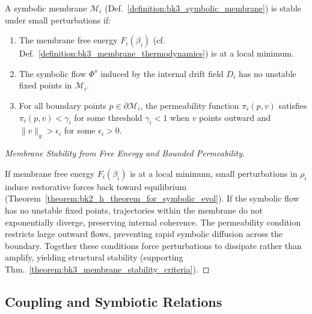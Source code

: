 \begin{theorem} \label{theorem:bk3_membrane_stability_criteria}
A symbolic membrane $\mathcal{M}_i$ (Def.~\ref{definition:bk3_symbolic_membrane}) is stable under small perturbations if:
\begin{enumerate}
    \item The membrane free energy $F_i(\beta_i)$ (cf. Def.~\ref{definition:bk3_membrane_thermodynamics}) is at a local minimum.
    \item The symbolic flow $\Phi^s$ induced by the internal drift field $D_i$ has no unstable fixed points in $\mathcal{M}_i$.
    \item For all boundary points $p \in \partial\mathcal{M}_i$, the permeability function $\pi_i(p,v)$ satisfies $\pi_i(p,v) < \gamma_i$ for some threshold $\gamma_i < 1$ when $v$ points outward and $\|v\|_g > \epsilon_i$ for some $\epsilon_i > 0$.
\end{enumerate}
\end{theorem}

\begin{proof}[Membrane Stability from Free Energy and Bounded Permeability]
\label{proof:bk3_membrane_stability_energy_permeability}
\leavevmode

If membrane free energy $F_i(\beta_i)$ is at a local minimum, small
perturbations in $\rho_i$ induce restorative forces back toward equilibrium
(Theorem~\ref{theorem:bk2_h_theorem_for_symbolic_evol}).
If the symbolic flow has no unstable fixed points, trajectories within the membrane do not exponentially diverge, preserving internal coherence.
The permeability condition restricts large outward flows, preventing rapid symbolic diffusion across the boundary.
Together these conditions force perturbations to dissipate rather than amplify, yielding structural stability (supporting Thm.~\ref{theorem:bk3_membrane_stability_criteria}).
\end{proof}

\subsection{Coupling and Symbiotic Relations}


